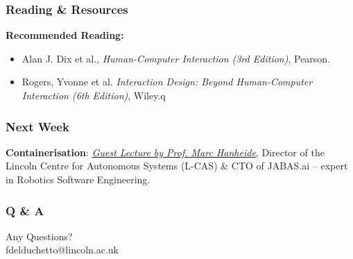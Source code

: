 \documentclass[xcolor=table]{beamer}
\begin{document}
\begin{frame}
    \frametitle{Reading \& Resources}
    \textbf{Recommended Reading:} 
    \begin{itemize}
        \item Alan J. Dix et al., \textit{Human-Computer Interaction (3rd Edition)}, Pearson.
        \item Rogers, Yvonne et al. \textit{Interaction Design: Beyond Human-Computer Interaction (6th Edition)}, Wiley.q
    \end{itemize}
\end{frame}

\begin{frame}
    \frametitle{Next Week}
    \begin{center}
     \textbf{Containerisation}: \underline{\textit{Guest Lecture by Prof. Marc Hanheide}}, \small{Director of the Lincoln Centre for Autonomous Systems (L-CAS) \& CTO of JABAS.ai -- expert in Robotics Software Engineering}.
    \end{center}
\end{frame}

\begin{frame}
    \frametitle{Q \& A}
    \begin{center}
        \Huge Any Questions?\\\vspace{0.5cm} 
        \normalsize fdelduchetto@lincoln.ac.uk
    \end{center}
\end{frame}
\end{document}
